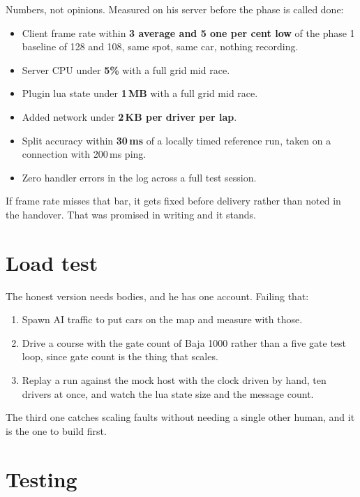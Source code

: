 \documentclass[11pt,a4paper]{article}
\begin{document}
Numbers, not opinions. Measured on his server before the phase is called done:

\begin{itemize}
  \item Client frame rate within \textbf{3 average and 5 one per cent low} of
        the phase 1 baseline of 128 and 108, same spot, same car, nothing
        recording.
  \item Server CPU under \textbf{5\%} with a full grid mid race.
  \item Plugin lua state under \textbf{1\,MB} with a full grid mid race.
  \item Added network under \textbf{2\,KB per driver per lap}.
  \item Split accuracy within \textbf{30\,ms} of a locally timed reference run,
        taken on a connection with 200\,ms ping.
  \item Zero handler errors in the log across a full test session.
\end{itemize}

If frame rate misses that bar, it gets fixed before delivery rather than noted
in the handover. That was promised in writing and it stands.

\section{Load test}

The honest version needs bodies, and he has one account. Failing that:

\begin{enumerate}
  \item Spawn AI traffic to put cars on the map and measure with those.
  \item Drive a course with the gate count of Baja 1000 rather than a five gate
        test loop, since gate count is the thing that scales.
  \item Replay a run against the mock host with the clock driven by hand, ten
        drivers at once, and watch the lua state size and the message count.
\end{enumerate}

The third one catches scaling faults without needing a single other human, and
it is the one to build first.

\section{Testing}
\end{document}

